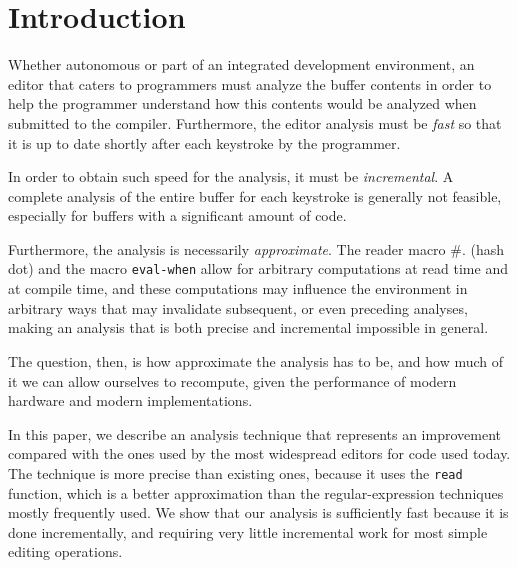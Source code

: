 \section{Introduction}

Whether autonomous or part of an integrated development environment,
an editor that caters to \commonlisp{} programmers must analyze the
buffer contents in order to help the programmer understand how this
contents would be analyzed when submitted to the \commonlisp{}
compiler.  Furthermore, the editor analysis must be \emph{fast} so
that it is up to date shortly after each keystroke by the programmer.

In order to obtain such speed for the analysis, it must be
\emph{incremental}.  A complete analysis of the entire buffer for each
keystroke is generally not feasible, especially for buffers with a
significant amount of code.

Furthermore, the analysis is necessarily \emph{approximate}.  The
reader macro \#. (hash dot) and the macro \texttt{eval-when} allow for
arbitrary computations at read time and at compile time, and these
computations may influence the environment in arbitrary ways that may
invalidate subsequent, or even preceding analyses, making an analysis
that is both precise and incremental impossible in general.

The question, then, is how approximate the analysis has to be, and how
much of it we can allow ourselves to recompute, given the performance
of modern hardware and modern \commonlisp{} implementations.

In this paper, we describe an analysis technique that represents an
improvement compared with the ones used by the most widespread editors
for \commonlisp{} code used today.  The technique is more precise than
existing ones, because it uses the \commonlisp{} \texttt{read}
function, which is a better approximation than the regular-expression
techniques mostly frequently used.  We show that our analysis is
sufficiently fast because it is done incrementally, and requiring very
little incremental work for most simple editing operations.

